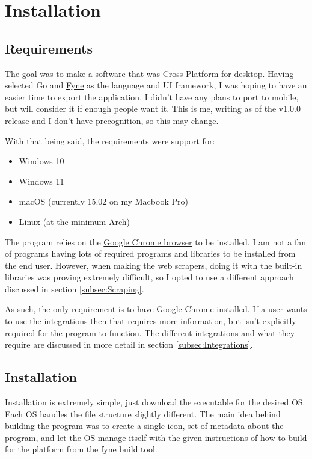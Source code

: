 \section{Installation}

\subsection{Requirements}

The goal was to make a software that was Cross-Platform for desktop.
Having selected Go and \href{https://fyne.io/}{Fyne} as the language and UI
framework, I was hoping to have an easier time to export the application.
I didn't have any plans to port to mobile, but will consider it if
enough people want it. This is me, writing as of the v1.0.0 release
and I don't have precognition, so this may change.

With that being said, the requirements were support for:
\begin{itemize}
	\item Windows 10
	\item Windows 11
	\item macOS (currently 15.02 on my Macbook Pro)
	\item Linux (at the minimum Arch)
\end{itemize}

The program relies on the
\href{https://www.google.com/chrome/}{Google Chrome browser} to be installed.
I am not a fan of programs having lots of required programs and
libraries to be installed from the end user.
However, when making the web scrapers, doing it with the built-in
libraries was proving extremely difficult, so I opted to use a
different approach discussed in section \ref{subsec:Scraping}.

As such, the only requirement is to have Google Chrome installed.
If a user wants to use the integrations then that requires more
information, but isn't explicitly required for the program to function.
The different integrations and what they require are discussed in
more detail in section \ref{subsec:Integrations}.

\subsection{Installation}

Installation is extremely simple, just download the executable for
the desired OS.
Each OS handles the file structure slightly different.
The main idea behind building the program was to create a single
icon, set of metadata about
the program, and let the OS manage itself with the given instructions
of how to build for the platform from the fyne build tool.

